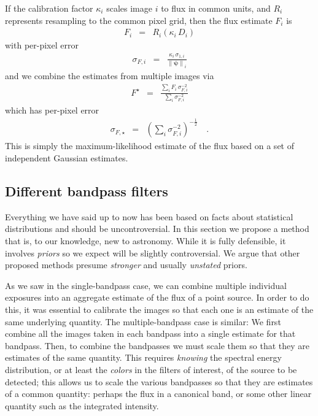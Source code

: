 \documentclass[letterpaper,preprint]{aastex}
\newcommand{\psf}{\psi}
\newcommand{\psfnorm}{\norm{\bm{\psf}}}
\newcommand{\norm}[1]{\left\lVert #1 \right\rVert}
\begin{document}


If the calibration factor $\kappa_i$ scales image $i$ to flux in
common units, and $R_i$ represents resampling to the common pixel grid,
then the flux estimate $F_i$ is
\begin{eqnarray}
F_i &=& R_i(\kappa_i \, D_i)
\end{eqnarray}
with per-pixel error
\begin{eqnarray}
\sigma_{F, i} &=& \frac{\kappa_i \, \sigma_{1,i}}{\psfnorm_i}
\end{eqnarray}
and we combine the estimates from multiple images via
\begin{eqnarray}
F^{\star} &=& \frac{\displaystyle\sum_i F_i \, \sigma^{-2}_{F,i}}{\displaystyle\sum_i \sigma^{-2}_{F,i}}
\label{eq:onebandmap}
\end{eqnarray}
which has per-pixel error
\begin{eqnarray}
\sigma_{F, \star} &=& \left( \sum_i \sigma^{-2}_{F,i} \right)^{-\frac{1}{2}}    \quad .
\end{eqnarray}
This is simply the maximum-likelihood estimate of the flux based on a
set of independent Gaussian estimates.



\subsection{Different bandpass filters}

Everything we have said up to now has been based on facts about
statistical distributions and should be uncontroversial.  In this section we
propose a method that is, to our knowledge, new to astronomy.  While
it is fully defensible, it involves \emph{priors} so we expect will be
slightly controversial.  We argue that other proposed methods presume
\emph{stronger} and usually \emph{unstated} priors.


As we saw in the single-bandpass case, we can combine multiple
individual exposures into an aggregate estimate of the flux of a point
source.  In order to do this, it was essential to calibrate the images
so that each one is an estimate of the same underlying quantity.  The
multiple-bandpass case is similar: We first combine all the images
taken in each bandpass into a single estimate for that bandpass.
Then, to combine the bandpasses we must scale them so that they are
estimates of the same quantity.  This requires \emph{knowing} the
spectral energy distribution, or at least the \emph{colors} in the
filters of interest, of the source to be detected; this allows us to
scale the various bandpasses so that they are estimates of a common
quantity: perhaps the flux in a canonical band, or some other linear
quantity such as the integrated intensity.
\end{document}
